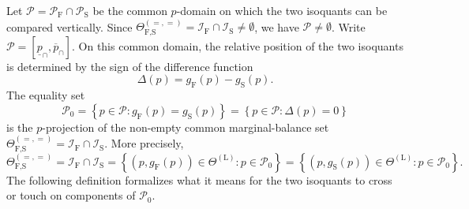 \documentclass[a4paper,12pt]{article}
\begin{document}
Let $\mathcal{P}=\mathcal{P}_{\text{F}}\cap\mathcal{P}_{\text{S}}$ be the common $p$-domain on which the two isoquants can be compared vertically. Since $\Theta_{\text{F,S}}^{\left(=,=\right)}=\mathcal{I}_{\text{F}}\cap\mathcal{I}_{\text{S}}\neq\emptyset$, we have $\mathcal{P}\neq\emptyset$. Write $\mathcal{P}=\left[\underline{p}_{\cap},\overline{p}_{\cap}\right]$. On this common domain, the relative position of the two isoquants is determined by the sign of the difference function
\begin{equation}
\Delta\left(p\right)=g_{\text{F}}\left(p\right)-g_{\text{S}}\left(p\right).
\label{eq:Delta_function}
\end{equation}
The equality set
\begin{equation}
\mathcal{P}_0=\left\{p\in\mathcal{P}:g_{\text{F}}\left(p\right)=g_{\text{S}}\left(p\right)\right\}=\left\{p\in\mathcal{P}:\Delta\left(p\right)=0\right\}
\label{eq:equality_set}
\end{equation}
is the $p$-projection of the non-empty common marginal-balance set $\Theta_{\text{F,S}}^{\left(=,=\right)}=\mathcal{I}_{\text{F}}\cap\mathcal{I}_{\text{S}}$. More precisely,
\begin{equation*}
\Theta_{\text{F,S}}^{\left(=,=\right)}=\mathcal{I}_{\text{F}}\cap\mathcal{I}_{\text{S}}=\left\{\left(p,g_{\text{F}}\left(p\right)\right)\in\Theta^{\left(\text{L}\right)}:p\in\mathcal{P}_0\right\}=\left\{\left(p,g_{\text{S}}\left(p\right)\right)\in\Theta^{\left(\text{L}\right)}:p\in\mathcal{P}_0\right\}.
\end{equation*}
The following definition formalizes what it means for the two isoquants to cross or touch on components of $\mathcal{P}_0$.
\end{document}
